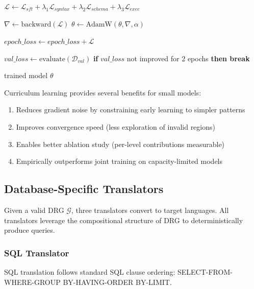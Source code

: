 \documentclass[conference]{IEEEtran}
\begin{document}
\begin{algorithm}[t]
\begin{algorithmic}[1]
      \STATE $\mathcal{L} \gets \mathcal{L}_{sft} + \lambda_1 \mathcal{L}_{syntax} + \lambda_2 \mathcal{L}_{schema} + \lambda_3 \mathcal{L}_{exec}$
      
      \STATE $\nabla \gets \text{backward}(\mathcal{L})$
      \STATE $\theta \gets \text{AdamW}(\theta, \nabla, \alpha)$
      
      \STATE $epoch\_loss \gets epoch\_loss + \mathcal{L}$
      
    \ENDFOR
  \ENDFOR
  
  \STATE $val\_loss \gets \text{evaluate}(\mathcal{D}_{val})$
  \STATE \textbf{if} $val\_loss$ not improved for 2 epochs \textbf{then break}
  
\ENDFOR

\RETURN trained model $\theta$
\end{algorithmic}
\end{algorithm}

Curriculum learning provides several benefits for small models:
\begin{enumerate}
\item Reduces gradient noise by constraining early learning to simpler patterns
\item Improves convergence speed (less exploration of invalid regions)
\item Enables better ablation study (per-level contributions measurable)
\item Empirically outperforms joint training on capacity-limited models
\end{enumerate}

\subsection{Database-Specific Translators}
\label{sec:translators}

Given a valid DRG $\mathcal{G}$, three translators convert to target languages. All translators leverage the compositional structure of DRG to deterministically produce queries.

\subsubsection{SQL Translator}

SQL translation follows standard SQL clause ordering: SELECT-FROM-WHERE-GROUP BY-HAVING-ORDER BY-LIMIT.
\end{document}
